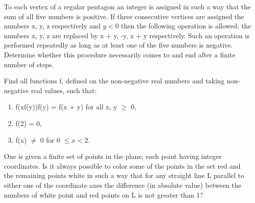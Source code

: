 \item To each vertex of a regular pentagon an integer is assigned in such a way that the sum of all five numbers is positive. If three consecutive vertices are assigned the numbers x, y, z respectively and $y < 0$ then the following operation is allowed: the numbers x, y, z are replaced by x + y, -y, z + y respectively. Such an operation is performed repeatedly as long as at least one of the five numbers is negative. Determine whether this procedure necessarily comes to and end after a finite number of steps.

\item Find all functions f, defined on the non-negative real numbers and taking non-negative real values, such that:
\begin{enumerate}
\item f(xf(y))f(y) = f(x + y) for all x, y $\geq$ 0,
\item f(2) = 0,
\item f(x) $\neq$ 0 for 0 $\leq x < 2$.
\end{enumerate}

\item One is given a finite set of points in the plane, each point having integer coordinates. Is it always possible to color some of the points in the set red and the remaining points white in such a way that for any straight line L parallel to either one of the coordinate axes the difference (in absolute value) between the numbers of white point and red points on L is not greater than 1?






